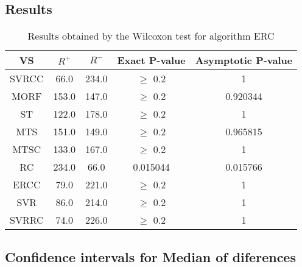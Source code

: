 \documentclass[a4paper,10pt]{article}
\begin{document}
\subsection{Results}

\begin{table}[!htp]
\centering\small
\begin{tabular}{
|c|c|c|c|c|}
\hline
 VS & $R^{+}$ & $R^{-}$ & Exact P-value & Asymptotic P-value \\ \hline 
SVRCC & 66.0 & 234.0 & $\geq$ 0.2 & 1\\ \hline 
MORF & 153.0 & 147.0 & $\geq$ 0.2 & 0.920344\\ \hline 
ST & 122.0 & 178.0 & $\geq$ 0.2 & 1\\ \hline 
MTS & 151.0 & 149.0 & $\geq$ 0.2 & 0.965815\\ \hline 
MTSC & 133.0 & 167.0 & $\geq$ 0.2 & 1\\ \hline 
RC & 234.0 & 66.0 & 0.015044 & 0.015766\\ \hline 
ERCC & 79.0 & 221.0 & $\geq$ 0.2 & 1\\ \hline 
SVR & 86.0 & 214.0 & $\geq$ 0.2 & 1\\ \hline 
SVRRC & 74.0 & 226.0 & $\geq$ 0.2 & 1\\ \hline 

\end{tabular}
\caption{Results obtained by the Wilcoxon test for algorithm ERC}
\end{table}

\subsection{Confidence intervals for Median of diferences}
\end{document}
